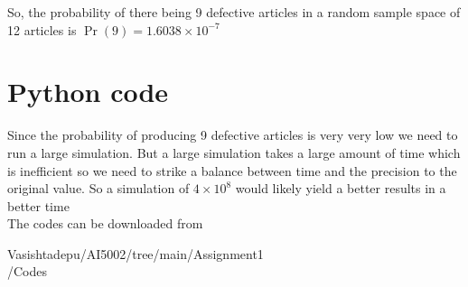 \documentclass[journal,12pt,twocolumn]{IEEEtran}
\begin{document}
So, the probability of there being 9 defective articles in a random sample space of 12 articles is $\Pr(9)=1.6038\times 10^{-7}$ 


\section*{Python code}
Since the probability of producing 9 defective articles is very very low we need to run a large simulation. But a large simulation takes a large amount of time which is inefficient so we need to strike a balance between time and the precision to the original value. So a simulation of $4\times10^8$ would likely yield a better results in a better time\\
The codes can be downloaded from

\begin{tcolorbox}{
Vasishtadepu/AI5002/tree/main/Assignment1\\/Codes
}
\end{tcolorbox}
\end{document}
